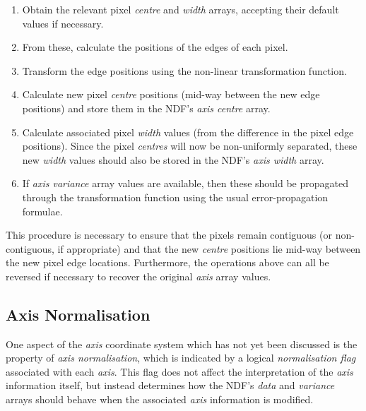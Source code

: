 \documentclass[twoside,11pt,nolof]{starlink}
\providecommand{\st}[1]{{\emph{#1}}}
\begin{document}
\begin{enumerate}

\item Obtain the relevant pixel \st{centre\/} and \st{width\/} arrays,
accepting their default values if necessary.

\item From these, calculate the positions of the edges of each pixel.

\item Transform the edge positions using the non-linear transformation
function.

\item Calculate new pixel \st{centre\/} positions (mid-way between the new
edge positions) and store them in the NDF's \st{axis centre\/} array.

\item Calculate associated pixel \st{width\/} values (from the difference
in the pixel edge positions).
Since the pixel \st{centres\/} will now be non-uniformly separated, these
new \st{width\/} values should also be stored in the NDF's \st{axis
width\/} array.

\item If \st{axis variance\/} array values are available, then these should
be propagated through the transformation function using the usual
error-propagation formulae.

\end{enumerate}

This procedure is necessary to ensure that the pixels remain contiguous
(or non-contiguous, if appropriate) and that the new \st{centre\/}
positions lie mid-way between the new pixel edge locations.
Furthermore, the operations above can all be reversed if necessary to
recover the original \st{axis\/} array values.

\subsection{\label{ss:axisnormalisation}Axis Normalisation}

One aspect of the \st{axis\/} coordinate system which has not yet been
discussed is the property of \st{axis normalisation}, which is indicated by
a logical \st{normalisation flag\/} associated with each \st{axis}.
This flag does not affect the interpretation of the \st{axis\/} information
itself, but instead determines how the NDF's \st{data\/} and
\st{variance\/} arrays should behave when the associated \st{axis\/}
information is modified.
\end{document}
